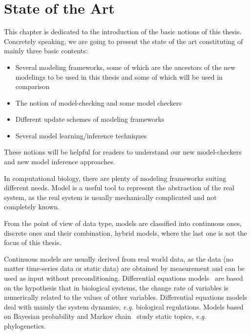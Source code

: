 \chapter{State of the Art}\label{chap:stateOfTheArt}

\begin{mybox}
This chapter is dedicated to the introduction of the basic notions of this thesis.
Concretely speaking, we are going to present the state of the art constituting of mainly three basic contents:

\begin{itemize}
    \item Several modeling frameworks, some of which are the ancestors of the new modelings to be used in this thesis and some of which will be used in comparison
    \item The notion of model-checking and some  model checkers 
    \item Different update schemes of modeling frameworks
    \item Several model learning/inference techniques
\end{itemize}

These notions will be helpful for readers to understand our new model-checkers and new model inference approaches.
\end{mybox}

In computational biology, there are plenty of modeling frameworks suiting different needs.
Model is a useful tool to represent the abstraction of the real system, as the real system is usually mechanically complicated and not completely known.

From the point of view of data type, models are classified into continuous ones, discrete ones and their combination, hybrid models, where the last one is not the focus of this thesis.

Continuous models are usually derived from real world data, as the data (no matter time-series data or static data) are obtained by measurement and can be used as input without preconditioning.
Differential equations models~\cite{glass1973logical,snoussi1989qualitative,thomas1990biological} are based on the hypothesis that in biological systems, the change rate of variables is numerically related to the values of other variables. 
Differential equations models deal with mainly the system dynamics, \textit{e.g.} biological regulations.
Models based on Bayesian probability and Markov chain~\cite{huelsenbeck2001mrbayes,larget1999markov} study static topics, \textit{e.g.} phylogenetics.

